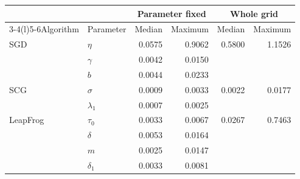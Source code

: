 \begin{tabular}{@{}ll rr rr@{}}
\toprule
& & \multicolumn{2}{c}{Parameter fixed} & \multicolumn{2}{c}{Whole grid} \\\cmidrule(lr){3-4}\cmidrule(l){5-6}Algorithm & Parameter & Median & Maximum & Median & Maximum \\
\midrule
SGD & $\eta$ & 0.0575 & 0.9062 & 0.5800 & 1.1526 \\
 & $\gamma$ & 0.0042 & 0.0150 &  &  \\
 & $b$ & 0.0044 & 0.0233 &  &  \\
SCG & $\sigma$ & 0.0009 & 0.0033 & 0.0022 & 0.0177 \\
 & $\lambda_1$ & 0.0007 & 0.0025 &  &  \\
LeapFrog & $\tau_0$ & 0.0033 & 0.0067 & 0.0267 & 0.7463 \\
 & $\delta$ & 0.0053 & 0.0164 &  &  \\
 & $m$ & 0.0025 & 0.0147 &  &  \\
 & $\delta_1$ & 0.0033 & 0.0081 &  &  \\
\bottomrule
\end{tabular}
